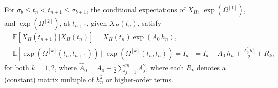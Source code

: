 \documentclass[onefignum]{siamart250211}
\begin{document}
\begin{lemma}\label{NewLemma3}
For $\sigma_b\leqslant t_n<t_{n+1}\leqslant\sigma_{b+1}$, the conditional expectations of $X_H$, $\exp\left(\Omega^{[1]}\right)$, and $\exp\left(\Omega^{[2]}\right)$, at $t_{n+1}$, given $X_H(t_n)$, satisfy
\begin{align}
&\mathbb{E}[X_H(t_{n+1})|X_H(t_n)]=X_H(t_n)\exp(A_0\,h_n),\label{EXHconditional}\\
&\mathbb{E}\left[\exp\left(\Omega^{[k]}(t_n,t_{n+1})\right)\!\mid\!\exp\left(\Omega^{[k]}(t_n,t_n)\right)\!=\!I_d\right]=I_d+A_0\,h_n+\frac{\hat{A}_0^2\,h_n^2}{2}+R_k,\label{EOmega1conditional}
\end{align}
for both $k=1,2$, where $\hat{A}_0=A_0-\frac{1}{2}\sum_{j=1}^mA_j^2$, where each $R_k$ denotes a (constant) matrix multiple of $h_n^2$ or higher-order terms.
\end{lemma}
\end{document}
